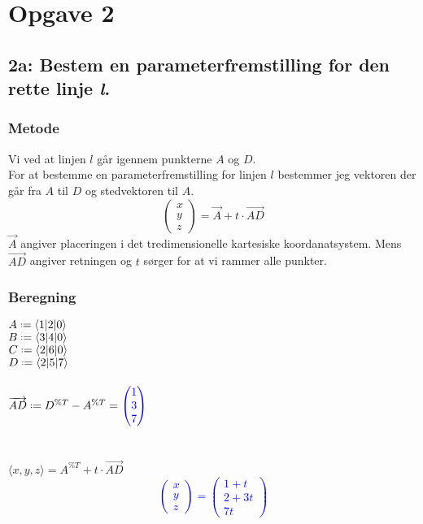 \documentclass[../main.tex]{subfiles}
\begin{document}
\section*{Opgave 2}
\subsection*{2a: Bestem en parameterfremstilling for den rette linje \textit{l}.}
    \subsubsection*{Metode}
        Vi ved at linjen \(l\) går igennem punkterne \(A\) og \(D\).\\
        For at bestemme en parameterfremstilling for linjen \(l\) bestemmer jeg vektoren der går fra \(A\) til \(D\) og stedvektoren til \(A\).\\
        \[\begin{pmatrix} x\\y\\z \end{pmatrix}=\overrightarrow{A}+t\cdot \overrightarrow{AD}\]
        \(\overrightarrow{A}\) angiver placeringen i det tredimensionelle kartesiske koordanatsystem. Mens \(\overrightarrow{AD}\) angiver retningen og \(t\) sørger for at vi rammer alle punkter.
    \subsubsection*{Beregning}
        \(A \defeq \langle 1{\vert 2\vert}0 \rangle\)\\
        \(B \defeq \langle 3{\vert 4\vert}0 \rangle\)\\
        \(C \defeq \langle 2{\vert 6\vert}0\rangle\)\\
        \(D \defeq \langle 2{\vert 5\vert}7 \rangle\)\\\\
        \(\overrightarrow{AD} \defeq D^{\%T} - A^{\%T}= \textcolor{blue}{\begin{pmatrix} 1\\ 3\\7 \end{pmatrix}}\)\\\\\\
        \(\langle x, y, z \rangle = A^{\%T}+ t\cdot \overrightarrow{AD}\)
        \textcolor{blue}{\[\begin{pmatrix} x \\ y\\ z\end{pmatrix}=\begin{pmatrix} 1+t \\ 2+3t\\ 7t\end{pmatrix}\]}
\end{document}
